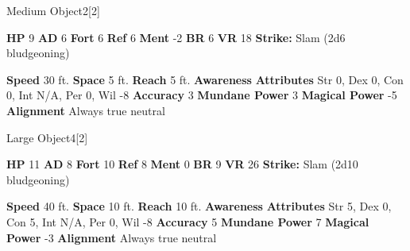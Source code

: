   

  \begin{monsubsection}{Medium Object}{2}[2]
    \vspace{-1em}\vspace{-1em}
    \vspace{0em}

    
    

    \begin{spellcontent}
      \begin{spelltargetinginfo}
        \pari \textbf{HP} 9 \monsep
          \textbf{AD} 6 \monsep
          \textbf{Fort} 6 \monsep
          \textbf{Ref} 6 \monsep
          \textbf{Ment} -2
        \pari \textbf{BR} 6 \monsep
        \textbf{VR} 18
        \pari \textbf{Strike:}
            Slam  (2d6 bludgeoning)
      \end{spelltargetinginfo}
    \end{spellcontent}
    \begin{monsterfooter}
      \pari \textbf{Speed} 30 ft. \monsep
        \textbf{Space} 5 ft. \monsep
        \textbf{Reach} 5 ft.
      \pari \textbf{Awareness} 
      \pari \textbf{Attributes}
        Str 0, Dex 0,
        Con 0, Int N/A,
        Per 0, Wil -8
      \pari \textbf{Accuracy} 3 \monsep
        \textbf{Mundane Power} 3 \monsep
      \textbf{Magical Power} -5
      \pari \textbf{Alignment} Always true neutral
    \end{monsterfooter}
  \end{monsubsection}
  
  

  \begin{monsubsection}{Large Object}{4}[2]
    \vspace{-1em}\vspace{-1em}
    \vspace{0em}

    
    

    \begin{spellcontent}
      \begin{spelltargetinginfo}
        \pari \textbf{HP} 11 \monsep
          \textbf{AD} 8 \monsep
          \textbf{Fort} 10 \monsep
          \textbf{Ref} 8 \monsep
          \textbf{Ment} 0
        \pari \textbf{BR} 9 \monsep
        \textbf{VR} 26
        \pari \textbf{Strike:}
            Slam  (2d10 bludgeoning)
      \end{spelltargetinginfo}
    \end{spellcontent}
    \begin{monsterfooter}
      \pari \textbf{Speed} 40 ft. \monsep
        \textbf{Space} 10 ft. \monsep
        \textbf{Reach} 10 ft.
      \pari \textbf{Awareness} 
      \pari \textbf{Attributes}
        Str 5, Dex 0,
        Con 5, Int N/A,
        Per 0, Wil -8
      \pari \textbf{Accuracy} 5 \monsep
        \textbf{Mundane Power} 7 \monsep
      \textbf{Magical Power} -3
      \pari \textbf{Alignment} Always true neutral
    \end{monsterfooter}
  \end{monsubsection}
  
